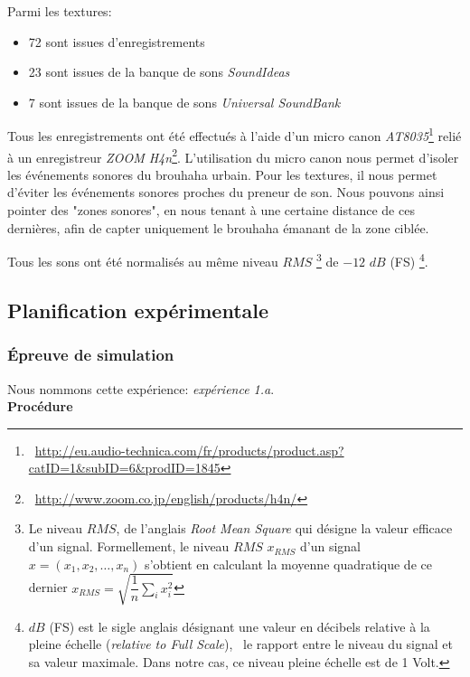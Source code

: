 Parmi les textures:

\begin{itemize}
\item 72 sont issues d’enregistrements
\item 23 sont issues de la banque de sons \emph{SoundIdeas}
\item 7 sont issues de la banque de sons \emph{Universal SoundBank}
\end{itemize}

Tous les enregistrements ont été effectués à l’aide d'un micro canon \emph{AT8035}\footnote{\cf~\url{http://eu.audio-technica.com/fr/products/product.asp?catID=1&subID=6&prodID=1845}} relié à un enregistreur \emph{ZOOM H4n}\footnote{\cf~\url{http://www.zoom.co.jp/english/products/h4n/}}. L’utilisation du micro canon nous permet d’isoler les événements sonores du brouhaha urbain. Pour les textures, il nous permet d’éviter les événements sonores proches du preneur de son. Nous pouvons ainsi pointer des "zones sonores", en nous tenant à une certaine distance de ces dernières, afin de capter uniquement le brouhaha émanant de la zone ciblée.

Tous les sons ont été normalisés au même niveau $RMS$ \footnote{Le niveau $RMS$, de l'anglais \emph{Root Mean Square} qui désigne la valeur efficace d'un signal. Formellement, le niveau $RMS$ $x_{RMS}$ d'un signal $x=(x_1,x_2,\ldots,x_n)$ s'obtient en calculant la moyenne quadratique de ce dernier $x_{RMS}=\sqrt{\dfrac{1}{n}\sum\limits_{i} x_i^2}$} de $-12$ $dB$ (FS) \footnote{$dB$ (FS) est le sigle anglais désignant une valeur en décibels relative à la pleine échelle (\emph{relative to Full Scale}), \ie~le rapport entre le niveau du signal et sa valeur maximale. Dans notre cas, ce niveau pleine échelle est de 1 Volt.}.

\subsection{Planification expérimentale}

\subsubsection{Épreuve de simulation}
\label{sec:ch5_planExpSimu}

Nous nommons cette expérience: \emph{expérience 1.a}. \\

\textbf{Procédure} \\

